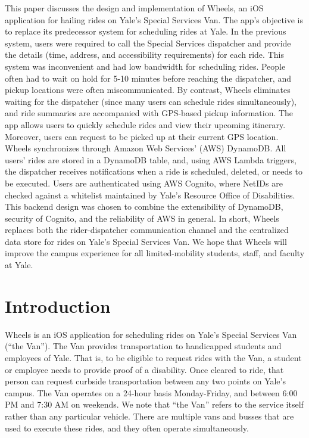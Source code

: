 \documentclass[12pt, a4paper]{article}
\author{\theauthor}
\title{\thetitle}
\date{\duedate}
\renewenvironment{abstract}
 {\small
  \begin{center}
  \bfseries \abstractname\vspace{-.5em}\vspace{0pt}
  \end{center}
  \list{}{%
    \setlength{\leftmargin}{0mm}%
    \setlength{\rightmargin}{\leftmargin}%
  }%
  \item\relax}
 {\endlist}
\begin{document}
\maketitle
\thispagestyle{empty}
\begin{multicols*}{2}
\begin{abstract}
    This paper discusses the design and implementation of Wheels, an iOS application for hailing rides on Yale's Special Services Van. The app's objective is to replace its predecessor system for scheduling rides at Yale. In the previous system, users were required to call the Special Services dispatcher and provide the details (time, address, and accessibility requirements) for each ride. This system was inconvenient and had low bandwidth for scheduling rides. People often had to wait on hold for 5-10 minutes before reaching the dispatcher, and pickup locations were often miscommunicated. By contrast, Wheels eliminates waiting for the dispatcher (since many users can schedule rides simultaneously), and ride summaries are accompanied with GPS-based pickup information. The app allows users to quickly schedule rides and view their upcoming itinerary. Moreover, users can request to be picked up at their current GPS location. Wheels synchronizes through Amazon Web Services' (AWS) DynamoDB. All users' rides are stored in a DynamoDB table, and, using AWS Lambda triggers, the dispatcher receives notifications when a ride is scheduled, deleted, or needs to be executed. Users are authenticated using AWS Cognito, where NetIDs are checked against a whitelist maintained by Yale's Resource Office of Disabilities. This backend design was chosen to combine the extensibility of DynamoDB, security of Cognito, and the reliability of AWS in general. In short, Wheels replaces both the rider-dispatcher communication channel and the centralized data store for rides on Yale's Special Services Van. We hope that Wheels will improve the campus experience for all limited-mobility students, staff, and faculty at Yale.
\end{abstract}

\section{Introduction}\label{sec:intro}
Wheels is an iOS application for scheduling rides on Yale's Special Services Van (``the Van''). The Van provides transportation to handicapped students and employees of Yale. That is, to be eligible to request rides with the Van, a student or employee needs to provide proof of a disability. Once cleared to ride, that person can request curbside transportation between any two points on Yale's campus. The Van operates on a 24-hour basis Monday-Friday, and between 6:00 PM and 7:30 AM on weekends. We note that ``the Van'' refers to the service itself rather than any particular vehicle. There are multiple vans and busses that are used to execute these rides, and they often operate simultaneously.


\end{multicols*}
\end{document}
